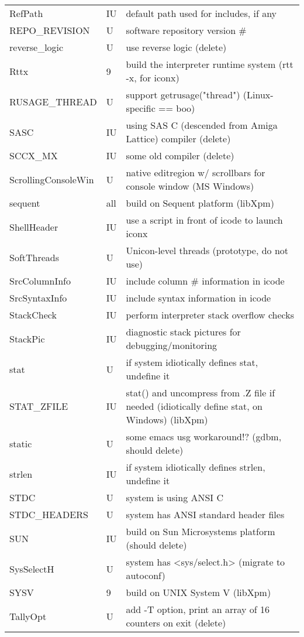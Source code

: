 \begin{xtabular}{|m{1.8in}|m{0.5in}|m{4.0in}|}
RefPath & IU & default path used for includes, if any \\
REPO\_REVISION & U & software repository version \# \\
reverse\_logic & U & use reverse logic (delete) \\
Rttx & 9 & build the interpreter runtime system (rtt -x, for iconx) \\
RUSAGE\_THREAD & U & support getrusage("thread") (Linux-specific == boo) \\
SASC & IU & using SAS C (descended from Amiga Lattice) compiler (delete) \\
SCCX\_MX & IU & some old compiler (delete) \\
ScrollingConsoleWin & U & native editregion w/ scrollbars for console window (MS Windows) \\
sequent & all & build on Sequent platform (libXpm) \\
ShellHeader & IU & use a script in front of icode to launch iconx \\
SoftThreads & U & Unicon-level threads (prototype, do not use) \\
SrcColumnInfo & IU & include column \# information in icode \\
SrcSyntaxInfo & IU & include syntax information in icode \\
StackCheck & IU & perform interpreter stack overflow checks \\
StackPic & IU & diagnostic stack pictures for debugging/monitoring \\
stat & U & if system idiotically defines stat, undefine it \\
STAT\_ZFILE & IU & stat() and uncompress from .Z file if needed (idiotically define stat, on Windows) (libXpm) \\
static & U & some emacs usg workaround!? (gdbm, should delete) \\
strlen & IU & if system idiotically defines strlen, undefine it \\
STDC & U & system is using ANSI C \\
STDC\_HEADERS & U & system has ANSI standard header files \\
SUN & IU & build on Sun Microsystems platform (should delete) \\
SysSelectH & U & system has <sys/select.h> (migrate to autoconf) \\
SYSV & 9 & build on UNIX System V (libXpm) \\
TallyOpt & U & add -T option, print an array of 16 counters on exit (delete) \\

\end{xtabular}
